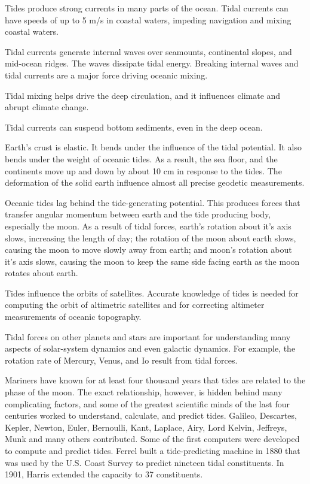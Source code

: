\begin{enumerate}
\vitem Tides produce strong currents in many parts of the ocean. Tidal
currents can have speeds
of up to 5 m/s in coastal waters, impeding navigation and mixing
coastal waters.

\vitem Tidal currents
generate internal waves over seamounts, continental slopes, and
mid-ocean ridges. The waves dissipate tidal energy. Breaking internal
waves and tidal currents are a major force driving oceanic
mixing.

\vitem Tidal mixing helps drive the deep circulation, and it
influences climate and abrupt climate change.

\vitem Tidal currents can
suspend bottom sediments, even in the deep ocean.

\vitem Earth's crust is elastic. It bends under the influence of the
tidal potential. It also bends under the weight of oceanic tides. As a
result, the sea floor, and the continents move up and down by about 10
cm in response to the tides. The deformation of the solid earth
influence almost all precise geodetic measurements.

\vitem Oceanic tides lag behind the tide-generating potential. This
produces forces that transfer angular momentum between earth and the
tide produc\-ing body, especially the moon. As a result of
tidal forces, earth's rotation about it's axis slows, increasing the
length of day; the rotation of the moon about earth slows, causing the
moon to move slowly away from earth; and moon's rotation about it's
axis slows, causing the moon to keep the same side facing earth as the
moon rotates about earth.

\vitem Tides influence the orbits of satellites. Accurate knowledge of
tides is needed for computing the orbit of altimetric satellites and
for correcting altimeter measurements of oceanic topography.

\vitem Tidal forces on other planets and stars are important for
understanding many aspects of solar-system dynamics and even galactic
dynamics. For example, the rotation rate of Mercury, Venus, and Io
result from tidal forces.
\end{enumerate}

Mariners have known for at least four thousand years that tides are
related to the phase of the moon. The exact relationship,
however, is hidden behind many complicating factors, and some of the
greatest scientific minds of the last four centuries worked to
understand, calculate, and predict tides. Galileo, Descartes, Kepler,
Newton, Euler, Bernoulli, Kant, Laplace, Airy, Lord Kelvin, Jeffreys,
Munk and many others contributed. Some of the first computers were
developed to compute and predict tides. Ferrel built a tide-predicting
machine in 1880 that was used by the U.S. Coast Survey to predict
nineteen tidal constituents. In 1901, Harris extended the capacity to
37 constituents.

